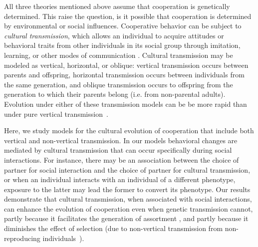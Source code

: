 \documentclass[12pt]{extarticle}
\begin{document}
All three theories mentioned above assume that cooperation is genetically determined. This raise the question, is it possible that cooperation is determined by environmental or social influences.
Cooperative behavior can be subject to \emph{cultural transmission}, which allows an individual to acquire attitudes or behavioral traits from other individuals in its social group through imitation, learning, or other modes of communication \citep{cavalli1981cultural,richerson2008not}.
Cultural transmission may be  modeled as vertical, horizontal, or oblique:  vertical transmission occurs between parents and offspring, horizontal transmission occurs between individuals from the same generation, and oblique transmission occurs  to offspring from the generation to which their parents belong (i.e. from non-parental adults). 
Evolution under either of these transmission models can be be more rapid than under pure vertical transmission~\citep{cavalli1981cultural,lycett2008questions,ram2018evolution}.

Here, we study models for the cultural evolution of cooperation that include both vertical and non-vertical transmission. 
In our models behavioral changes are mediated by cultural transmission that can occur specifically during social interactions.
For instance, there may be an association between the choice of partner for social interaction and the choice of partner for cultural transmission,
or when an individual interacts with an individual of a different phenotype,  exposure to the latter may lead the former to  convert its phenotype.
Our results demonstrate that cultural transmission, when associated with social interactions, can enhance the evolution of cooperation even when genetic transmission cannot, partly because it facilitates the generation of assortment \citep{Fletcher2009assortment}, and partly because it diminishes the effect of selection (due to non-vertical transmission from non-reproducing individuals~\citep{ram2018evolution}).
\end{document}

